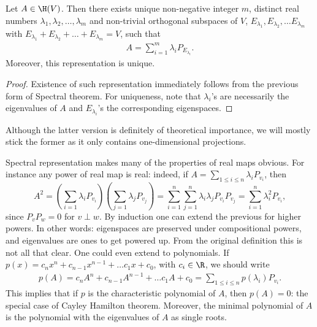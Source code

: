 \begin{lause}
	Let $A \in \H(V)$. Then there exists unique non-negative integer $m$, distinct real numbers $\lambda_{1}, \lambda_{2}, \ldots, \lambda_{m}$ and non-trivial orthogonal subspaces of $V$, $E_{\lambda_{1}}, E_{\lambda_{2}}, \ldots E_{\lambda_{m}}$ with $E_{\lambda_{1}} + E_{\lambda_{2}} + \ldots + E_{\lambda_{m}} = V$, such that
	\begin{align*}\label{spectralrepr2}
		A = \sum_{i = 1}^{m} \lambda_{i} P_{E_{\lambda_{i}}}.
	\end{align*}
	Moreover, this representation is unique.
\end{lause}
\begin{proof}
	Existence of such representation immediately follows from the previous form of Spectral theorem. For uniqueness, note that $\lambda_{i}$'s are necessarily the eigenvalues of $A$ and $E_{\lambda_{i}}$'s the corresponding eigenspaces.
\end{proof}

Although the latter version is definitely of theoretical importance, we will mostly stick the former as it only contains one-dimensional projections.

Spectral representation makes many of the properties of real maps obvious. For instance any power of real map is real: indeed, if $A = \sum_{1 \leq i \leq n} \lambda_{i} P_{v_{i}}$, then
\[
	A^{2} = \left(\sum_{i = 1} \lambda_{i} P_{v_{i}}\right) \left(\sum_{j = 1} \lambda_{j} P_{v_{j}}\right) = \sum_{i = 1}^{n} \sum_{j = 1}^{n}\lambda_{i} \lambda_{j} P_{v_{i}} P_{v_{j}} = \sum_{i = 1}^{n} \lambda_{i}^2 P_{v_{i}},
\]
since $P_{v} P_{w} = 0$ for $v \perp w$. By induction one can extend the previous for higher powers. In other words: eigenspaces are preserved under compositional powers, and eigenvalues are ones to get powered up. From the original definition this is not all that clear. One could even extend to polynomials. If $p(x) = c_{n} x^{n} + c_{n- 1} x^{n - 1} + \ldots c_{1} x + c_{0}$, with $c_{i} \in \R$, we should write
\begin{align}\label{polynomial_matrix_function}
	p(A) = c_{n} A^{n} + c_{n - 1} A^{n - 1} + \ldots c_{1} A + c_{0} = \sum_{1 \leq i \leq n} p(\lambda_{i}) P_{v_{i}}.
\end{align}
This implies that if $p$ is the characteristic polynomial of $A$, then $p(A) = 0$: the special case of Cayley Hamilton theorem. Moreover, the minimal polynomial of $A$ is the polynomial with the eigenvalues of $A$ as single roots.

